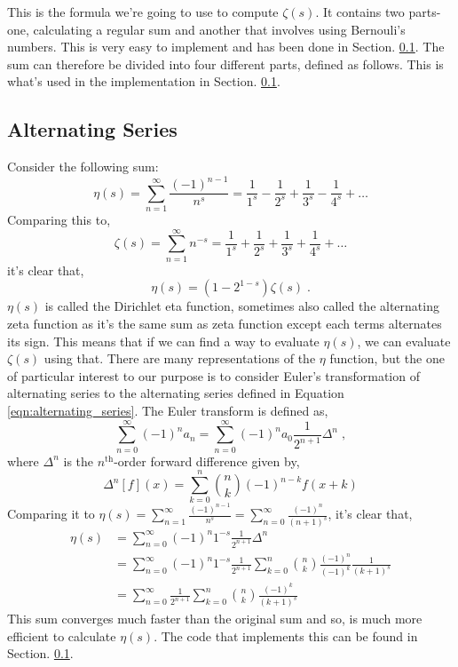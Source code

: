 \documentclass{amsproc}
\newcommand{\be}{\begin{equation}}
\newcommand{\ee}{\end{equation}}
\theoremstyle{definition}
\theoremstyle{remark}
\numberwithin{equation}{section}
\begin{document}
This is the formula we're going to use to compute $\zeta(s)$. It contains two parts- one, calculating a regular sum and another that involves using Bernouli's numbers. This is very easy to implement and has been done in Section. \ref{}. The sum can therefore be divided into four different parts, defined as follows. This is what's used in the implementation in Section. \ref{}.

\subsection{Alternating Series}
Consider the following sum:
\be
\label{eqn:alternating_series}
\eta(s) = \sum_{n = 1}^{\infty} \frac{ (-1)^{n - 1} }{n^s} = \frac{1}{1^s} - \frac{1}{2^s} + \frac{1}{3^s} - \frac{1}{4^s} + \ldots
\ee
Comparing this to,
\begin{equation*}
 \zeta(s) = \sum_{n = 1}^{\infty} n^{-s} = \frac{1}{1^s} + \frac{1}{2^s} + \frac{1}{3^s} + \frac{1}{4^s} + \ldots
\end{equation*}
it's clear that,
\be
\eta(s) = \left( 1 - 2^{1 - s} \right) \zeta(s) \;.
\ee
$\eta(s)$ is called the Dirichlet eta function, sometimes also called the alternating zeta function as it's the same sum as zeta function except each terms alternates its sign. This means that if we can find a way to evaluate $\eta(s)$, we can evaluate $\zeta(s)$ using that. There are many representations of the $\eta$ function, but the one of particular interest to our purpose is to consider Euler's transformation of alternating series to the alternating series defined in Equation \ref{eqn:alternating_series}. The Euler transform is defined as,
\be
\sum_{n = 0}^{\infty} (-1)^n a_n = \sum_{n = 0}^{\infty} (-1)^n a_0 \frac{ 1 }{2^{n + 1}} \Delta^n \;,
\ee
where $\Delta^n$ is the $n^{\mathrm{th}}$-order forward difference given by,
\begin{equation*}
 \Delta^n[f](x) = \sum_{k = 0}^{n} {n \choose k} (-1)^{n - k} f(x + k)
\end{equation*}
Comparing it to $\eta(s) = \sum_{n = 1}^{\infty} \frac{ (-1)^{n - 1} }{n^s} = \sum_{n = 0}^{\infty} \frac{ (-1)^n }{ (n + 1)^s }$, it's clear that,
\begin{align*}
\eta(s) &= \sum_{n=0}^{\infty} (-1)^n 1^{-s} \frac{1}{ 2^{n + 1} } \Delta^n \\
        &= \sum_{n=0}^{\infty} (-1)^n 1^{-s} \frac{1}{ 2^{n + 1} } \sum_{k=0}^{n} {n \choose k} \frac{ (-1)^n }{ (-1)^k } \frac{1}{ (k + 1)^s } \\
        &= \sum_{n=0}^{\infty} \frac{1}{ 2^{n + 1} } \sum_{k=0}^{n} {n \choose k} \frac{ (-1)^k }{ (k + 1)^s }
\end{align*}
This sum converges much faster than the original sum and so, is much more efficient to calculate $\eta(s)$. The code that implements this can be found in Section. \ref{}. 
\end{document}
